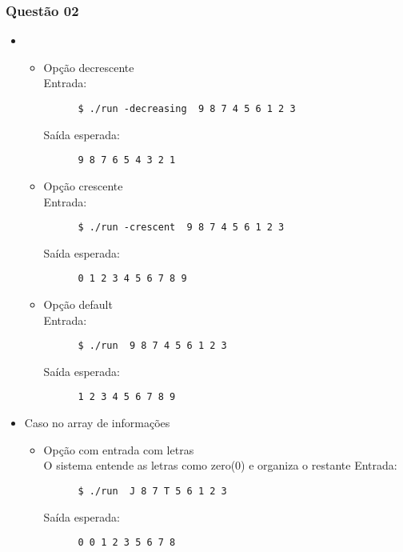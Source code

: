 \documentclass[11pt,a4paper]{article}
\begin{document}
\subsubsection{Questão 02}
\begin{itemize}
  \item
  \begin{itemize}
    \item Opção decrescente \\
    Entrada:
    \begin{verbatim}
      $ ./run -decreasing  9 8 7 4 5 6 1 2 3
    \end{verbatim}
    Saída esperada:
    \begin{verbatim}
      9 8 7 6 5 4 3 2 1
    \end{verbatim}
  \end{itemize}

  \begin{itemize}
    \item Opção crescente \\
    Entrada:
    \begin{verbatim}
      $ ./run -crescent  9 8 7 4 5 6 1 2 3
    \end{verbatim}
    Saída esperada:
    \begin{verbatim}
      0 1 2 3 4 5 6 7 8 9
    \end{verbatim}
  \end{itemize}

  \begin{itemize}
    \item Opção default \\
    Entrada:
    \begin{verbatim}
      $ ./run  9 8 7 4 5 6 1 2 3
    \end{verbatim}
    Saída esperada:
    \begin{verbatim}
      1 2 3 4 5 6 7 8 9
    \end{verbatim}
  \end{itemize}

  \item Caso no array de informações
  \begin{itemize}
    \item Opção com entrada com letras \\
    O sistema entende as letras como zero(0) e organiza o restante
    Entrada:
    \begin{verbatim}
      $ ./run  J 8 7 T 5 6 1 2 3
    \end{verbatim}
    Saída esperada:
    \begin{verbatim}
      0 0 1 2 3 5 6 7 8
    \end{verbatim}
  \end{itemize}



\end{itemize}
\end{document}
